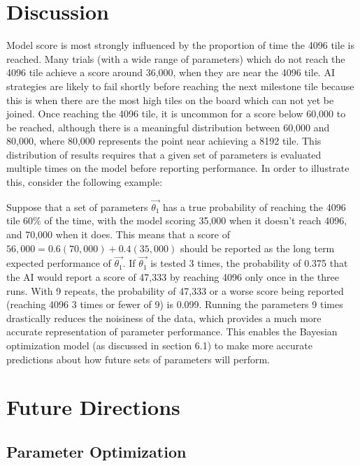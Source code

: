 \documentclass{article}
\begin{document}
\section{Discussion}
Model score is most strongly influenced by the proportion of time the 4096 tile is reached.  Many trials (with a wide range of parameters) which do not reach the 4096 tile achieve a score around 36,000, when they are near the 4096 tile.  AI strategies are likely to fail shortly before reaching the next milestone tile because this is when there are the most high tiles on the board which can not yet be joined.  Once reaching the 4096 tile, it is uncommon for a score below 60,000 to be reached, although there is a meaningful distribution between 60,000 and 80,000, where 80,000 represents the point near achieving a 8192 tile.   This distribution of results requires that a given set of parameters is evaluated multiple times on the model before reporting performance.  In order to illustrate this, consider the following example:

Suppose that a set of parameters $\vec{\theta_1}$ has a true probability of reaching the 4096 tile 60\% of the time, with the model scoring 35,000 when it doesn't reach 4096, and 70,000 when it does.  This means that a score of $56,000 = 0.6(70,000) + 0.4(35,000)$ should be reported as the long term expected performance of $\vec{\theta_1}$.  If $\vec{\theta_1}$ is tested 3 times, the probability of 0.375 that the AI would report a score of 47,333 by reaching 4096 only once in the three runs.   With 9 repeats, the probability of 47,333 or a worse score being reported (reaching 4096 3 times or fewer of 9) is 0.099.  Running the parameters 9 times drastically reduces the noisiness of the data, which provides a much more accurate representation of parameter performance. This enables the Bayesian optimization model (as discussed in section 6.1) to make more accurate predictions about how future sets of parameters will perform.
\\
\section{Future Directions}

\subsection{Parameter Optimization}
\end{document}

